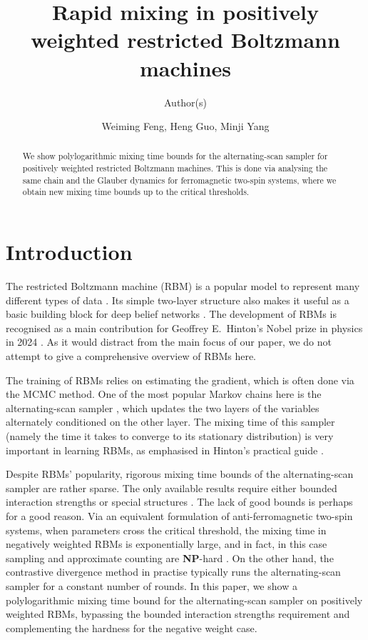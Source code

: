 \documentclass[11pt]{amsart}
\title{Rapid mixing in positively weighted restricted Boltzmann machines}
\author{Author(s)}
\author{Weiming Feng, Heng Guo, Minji Yang}
\date{}
\newcommand{\NP}{\textnormal{\textbf{NP}}}
\theoremstyle{definition}
\theoremstyle{remark}
\begin{document}
\begin{abstract}
  \sloppy
  We show polylogarithmic mixing time bounds for the alternating-scan sampler for positively weighted restricted Boltzmann machines.
  This is done via analysing the same chain and the Glauber dynamics for ferromagnetic two-spin systems,
  where we obtain new mixing time bounds up to the critical thresholds.
\end{abstract}


\allowdisplaybreaks
\maketitle

\section{Introduction}

The restricted Boltzmann machine (RBM) \cite{AHS85,Smo86} is a popular model to represent many different types of data \cite{HOT06,SMH07,MH10}.
Its simple two-layer structure also makes it useful as a basic building block for deep belief networks \cite{HOT06}.
The development of RBMs is recognised as a main contribution for Geoffrey E.\ Hinton's Nobel prize in physics in 2024 \cite{nobel24}.
As it would distract from the main focus of our paper, we do not attempt to give a comprehensive overview of RBMs here.

The training of RBMs relies on estimating the gradient,
which is often done via the MCMC method.
One of the most popular Markov chains here is the alternating-scan sampler \cite{Hin02}, 
which updates the two layers of the variables alternately conditioned on the other layer.
The mixing time of this sampler (namely the time it takes to converge to its stationary distribution) is very important in learning RBMs, 
as emphasised in Hinton's practical guide \cite{Hin12}.

Despite RBMs' popularity, rigorous mixing time bounds of the alternating-scan sampler are rather sparse.
The only available results require either bounded interaction strengths \cite{Tos16} or special structures \cite{KQWW26}.
The lack of good bounds is perhaps for a good reason.
Via an equivalent formulation of anti-ferromagnetic two-spin systems, 
when parameters cross the critical threshold,
the mixing time in negatively weighted RBMs is exponentially large,
and in fact, in this case sampling and approximate counting are \NP-hard \cite{Sly10,SS14,GSV16}.
On the other hand, the contrastive divergence method \cite{Hin12} in practise typically runs the alternating-scan sampler for a constant number of rounds.
In this paper, we show a polylogarithmic mixing time bound for the alternating-scan sampler on positively weighted RBMs,
bypassing the bounded interaction strengths requirement and complementing the hardness for the negative weight case.
\end{document}
